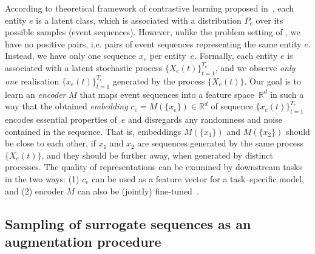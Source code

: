 \documentclass{article}
\newcommand{\R}{\mathbb{R}}
\begin{document}
According to theoretical framework of contrastive learning proposed in~\cite{Saunshi2019ICML}, each entity $e$ is a latent class, which is associated with a distribution $P_e$ over its possible samples (event sequences). However, unlike the problem setting of  \cite{Saunshi2019ICML}, we have no positive pairs, i.e. pairs of event sequences representing the same entity $e$. Instead, we have only one sequence $x_e$ per entity~$e$. Formally, each entity $e$ is associated with a latent stochastic process $\{X_e(t)\}_{t=1}^{T_e}$, and we observe {\it only one} realisation $\{x_e(t)\}_{t=1}^{T_e}$ generated by the process $\{X_e(t)\}$. Our goal is to learn an \textit{encoder} $M$ that maps event sequences into a feature space~$\R^d$ in such a way that the obtained \textit{embedding} $c_e=M(\{x_e\})\in \R^d$ of sequence $\{x_e(t)\}^{T_e}_{t=1}$ encodes essential properties of~$e$ and disregards any randomness and noise contained in the sequence. That is, embeddings $M(\{x_1\})$ and $M(\{x_2\})$ should be close to each other, if $x_1$ and $x_2$ are sequences generated by the same process $\{X_e(t)\}$, and they should be further away, when generated by distinct processes. The quality of representations can be examined by downstream tasks %
in the two ways: (1) $c_e$ can be used as a feature vector for a task--specific model, and (2) encoder $M$ can also be (jointly) fine-tuned~\citep{Yosinski2014HowTA}.

\subsection{Sampling of surrogate sequences as an augmentation procedure} \label{sec-pos-pairs}
\end{document}
